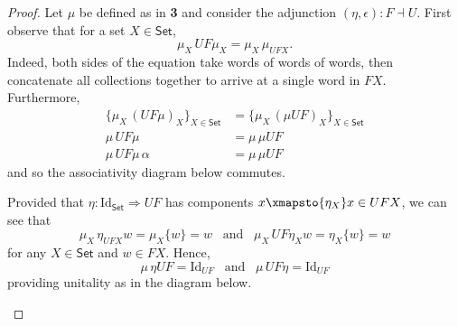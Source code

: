 \documentclass[ 12pt ]{article}
\begin{document}
\begin{enumerate}
		\begin{proof}
			Let $\mu$ be defined as in \textbf{3} and consider the adjunction $(\eta, \epsilon) : F \dashv U$. First observe that for a set $X \in \mathsf{Set}$, $$\mu_X\, UF \mu_X = \mu_X\, \mu_{UFX}.$$ Indeed, both sides of the equation take words of words of words, then concatenate all collections together to arrive at a single word in $FX$. Furthermore,
			\begin{align*}
				\{ \mu_X\, (UF \mu)_X \}_{X \in \mathsf{Set}} &= \{ \mu_X\, (\mu UF)_X \}_{X \in \mathsf{Set}} \\
				\mu\, UF \mu &= \mu\, \mu UF \\
				\mu\, UF \mu\, \alpha &= \mu\, \mu UF
			\end{align*}
			and so the associativity diagram below commutes.
			\begin{center}
			\end{center}
			Provided that $\eta : \mathrm{Id}_\mathsf{Set} \Rightarrow UF$ has components $x \xmapsto{\eta_X} x \in UFX$, we can see that $$\mu_X\, \eta_{UFX} w = \mu_X \{ w \} = w\;\;\; \mathrm{and}\;\;\; \mu_X\, UF \eta_X w = \eta_X \{ w \} = w$$ for any $X \in \mathsf{Set}$ and $w \in FX$. Hence, $$\mu\, \eta UF = \mathrm{Id}_{UF}\;\;\; \mathrm{and}\;\;\; \mu\, UF \eta = \mathrm{Id}_{UF}$$ providing unitality as in the diagram below.
			\begin{center}
			\end{center}
		\end{proof}

\end{enumerate}
\end{document}
